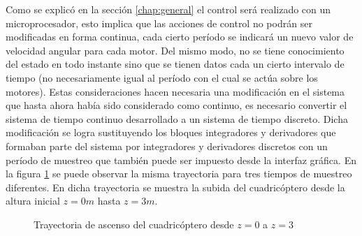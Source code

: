 \documentclass[main]{subfiles}
\begin{document}
Como se explic\'o en la secci\'on \ref{chap:general} el control ser\'a realizado con un microprocesador, esto implica que las acciones de control no podr\'an ser modificadas en forma continua, cada cierto per\'iodo se indicar\'a un nuevo valor de velocidad angular para cada motor. Del mismo modo, no se tiene conocimiento del estado en todo instante sino que se tienen datos cada un cierto intervalo de tiempo (no necesariamente igual al per\'iodo con el cual se act\'ua sobre los motores). Estas consideraciones hacen necesaria una modificaci\'on en el sistema que hasta ahora hab\'ia sido considerado como continuo, es necesario convertir el sistema de tiempo continuo desarrollado a un sistema de tiempo discreto. Dicha modificaci\'on se logra sustituyendo los bloques integradores y derivadores que formaban parte del sistema por integradores y derivadores discretos con un per\'iodo de muestreo que tambi\'en puede ser impuesto desde la interfaz gr\'afica. En la figura \ref{fig:t_muestreo} se puede observar la misma trayectoria para tres tiempos de muestreo diferentes. En dicha trayectoria se muestra la subida del cuadric\'optero desde la altura inicial $z=0m$ hasta $z=3m$. 
 
\begin{figure} [h!]
  \centering
  \caption{Trayectoria de ascenso del cuadric\'optero desde $z=0$ a $z=3$}
  \label{fig:t_muestreo}
\end{figure} 
 
\end{document}
